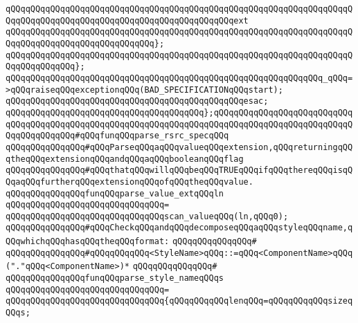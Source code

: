 \verb|qQQqqQQqqQQqqQQqqQQqqQQqqQQqqQQqqQQqqQQqqQQqqQQqqQQqqQQqqQQqqQQqqQQqqQQqqQQqqQQqqQQqqQQqqQQqqQQqqQQqqQQqqQQqqQQqqQQqext|\newline
\verb|qQQqqQQqqQQqqQQqqQQqqQQqqQQqqQQqqQQqqQQqqQQqqQQqqQQqqQQqqQQqqQQqqQQqqQQqqQQqqQQqqQQqqQQqqQQqqQQqqQQq};|\newline
\verb|qQQqqQQqqQQqqQQqqQQqqQQqqQQqqQQqqQQqqQQqqQQqqQQqqQQqqQQqqQQqqQQqqQQqqQQqqQQqqQQqqQQq};|\newline
\newline
\verb|qQQqqQQqqQQqqQQqqQQqqQQqqQQqqQQqqQQqqQQqqQQqqQQqqQQqqQQqqQQqqQQq_qQQq=>qQQqraiseqQQqexceptionqQQq(BAD_SPECIFICATIONqQQqstart);|\newline
\verb|qQQqqQQqqQQqqQQqqQQqqQQqqQQqqQQqqQQqqQQqqQQqqQQqesac;|\newline
\newline
\verb|qQQqqQQqqQQqqQQqqQQqqQQqqQQqqQQqqQQqqQQq};qQQqqQQqqQQqqQQqqQQqqQQqqQQqqQQqqQQqqQQqqQQqqQQqqQQqqQQqqQQqqQQqqQQqqQQqqQQqqQQqqQQqqQQqqQQqqQQqqQQqqQQqqQQqqQQq#qQQqfunqQQqparse_rsrc_specqQQq|\newline
\newline
\verb|qQQqqQQqqQQqqQQq#qQQqParseqQQqaqQQqvalueqQQqextension,qQQqreturningqQQqtheqQQqextensionqQQqandqQQqaqQQqbooleanqQQqflag|\newline
\verb|qQQqqQQqqQQqqQQq#qQQqthatqQQqwillqQQqbeqQQqTRUEqQQqifqQQqthereqQQqisqQQqaqQQqfurtherqQQqextensionqQQqofqQQqtheqQQqvalue.|\newline
\newline
\verb|qQQqqQQqqQQqqQQqfunqQQqparse_value_extqQQqln|\newline
\verb|qQQqqQQqqQQqqQQqqQQqqQQqqQQqqQQq=|\newline
\verb|qQQqqQQqqQQqqQQqqQQqqQQqqQQqqQQqscan_valueqQQq(ln,qQQq0);|\newline
\newline
\verb|qQQqqQQqqQQqqQQq#qQQqCheckqQQqandqQQqdecomposeqQQqaqQQqstyleqQQqname,qQQqwhichqQQqhasqQQqtheqQQqformat:|\newline
\verb|qQQqqQQqqQQqqQQq#|\newline
\verb|qQQqqQQqqQQqqQQq#qQQqqQQqqQQq<StyleName>qQQq::=qQQq<ComponentName>qQQq("."qQQq<ComponentName>)*|\newline
\verb|qQQqqQQqqQQqqQQq#|\newline
\verb|qQQqqQQqqQQqqQQqfunqQQqparse_style_nameqQQqs|\newline
\verb|qQQqqQQqqQQqqQQqqQQqqQQqqQQqqQQq=|\newline
\verb|qQQqqQQqqQQqqQQqqQQqqQQqqQQqqQQq{qQQqqQQqqQQqlenqQQq=qQQqqQQqqQQqsizeqQQqs;|\newline
